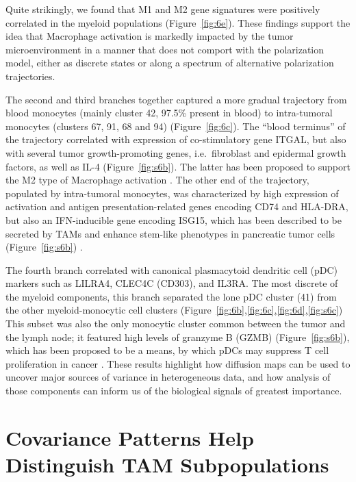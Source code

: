 Quite strikingly, we found that M1 and M2 gene signatures were positively correlated in the myeloid populations (Figure~\ref{fig:6e}).
These findings support the idea that Macrophage activation is markedly impacted by the tumor microenvironment in a manner that does not comport with the polarization model, either as discrete states or along a spectrum of alternative polarization trajectories.

The second and third branches together captured a more gradual trajectory from blood monocytes (mainly cluster 42, 97.5\% present in blood) to intra-tumoral monocytes (clusters 67, 91, 68 and 94) (Figure~\ref{fig:6c}).
The ``blood terminus'' of the trajectory correlated with expression of co-stimulatory gene ITGAL, but also with several tumor growth-promoting genes, i.e.\ fibroblast and epidermal growth factors, as well as IL-4 (Figure~\ref{fig:s6b}).
The latter has been proposed to support the M2 type of Macrophage activation \citep{Mantovani2013,Mills2000,Murray2014}.
The other end of the trajectory, populated by intra-tumoral monocytes, was characterized by high expression of activation and antigen presentation-related genes encoding CD74 and HLA-DRA, but also an IFN-inducible gene encoding ISG15, which has been described to be secreted by TAMs and enhance stem-like phenotypes in pancreatic tumor cells (Figure~\ref{fig:s6b}) \citep{Sainz2014}.

The fourth branch correlated with canonical plasmacytoid dendritic cell (pDC) markers such as LILRA4, CLEC4C (CD303), and IL3RA\@.
The most discrete of the myeloid components, this branch separated the lone pDC cluster (41) from the other myeloid-monocytic cell clusters (Figure~\ref{fig:6b},\ref{fig:6c},\ref{fig:6d},\ref{fig:s6c}) This subset was also the only monocytic cluster common between the tumor and the lymph node; it featured high levels of granzyme B (GZMB) (Figure~\ref{fig:s6b}), which has been proposed to be a means, by which pDCs may suppress T cell proliferation in cancer \citep{Jahrsdoerfer2010,Swiecki2015}.
These results highlight how diffusion maps can be used to uncover major sources of variance in heterogeneous data, and how analysis of those components can inform us of the biological signals of greatest importance. 

\section{Covariance Patterns Help Distinguish TAM Subpopulations}

